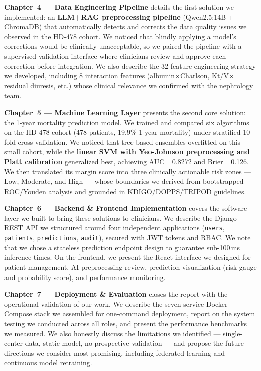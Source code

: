 \documentclass[12pt,a4paper,twoside]{report}
\begin{document}
\textbf{Chapter~4 — Data Engineering Pipeline} details the first solution we implemented: an \textbf{LLM+RAG preprocessing pipeline} (Qwen2.5:14B + ChromaDB) that automatically detects and corrects the data quality issues we observed in the HD-478 cohort. We noticed that blindly applying a model's corrections would be clinically unacceptable, so we paired the pipeline with a supervised validation interface where clinicians review and approve each correction before integration. We also describe the 32-feature engineering strategy we developed, including 8 interaction features (albumin$\times$Charlson, Kt/V$\times$residual diuresis, etc.) whose clinical relevance we confirmed with the nephrology team.

\textbf{Chapter~5 — Machine Learning Layer} presents the second core solution: the 1-year mortality prediction model. We trained and compared six algorithms on the HD-478 cohort (478 patients, 19.9\% 1-year mortality) under stratified 10-fold cross-validation. We noticed that tree-based ensembles overfitted on this small cohort, while the \textbf{linear SVM with Yeo-Johnson preprocessing and Platt calibration} generalized best, achieving AUC\,=\,0.8272 and Brier\,=\,0.126. We then translated its margin score into three clinically actionable risk zones — Low, Moderate, and High — whose boundaries we derived from bootstrapped ROC/Youden analysis and grounded in KDIGO/DOPPS/TRIPOD guidelines.

\textbf{Chapter~6 — Backend \& Frontend Implementation} covers the software layer we built to bring these solutions to clinicians. We describe the Django REST API we structured around four independent applications (\texttt{users}, \texttt{patients}, \texttt{predictions}, \texttt{audit}), secured with JWT tokens and RBAC. We note that we chose a stateless prediction endpoint design to guarantee sub-100\,ms inference times. On the frontend, we present the React interface we designed for patient management, AI preprocessing review, prediction visualization (risk gauge and probability score), and performance monitoring.

\textbf{Chapter~7 — Deployment \& Evaluation} closes the report with the operational validation of our work. We describe the seven-service Docker Compose stack we assembled for one-command deployment, report on the system testing we conducted across all roles, and present the performance benchmarks we measured. We also honestly discuss the limitations we identified — single-center data, static model, no prospective validation — and propose the future directions we consider most promising, including federated learning and continuous model retraining.
\end{document}
